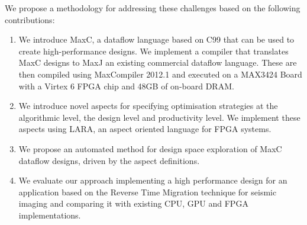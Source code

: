 We propose a methodology for addressing these challenges based on the
following contributions:
\begin{enumerate}
\item We introduce MaxC, a dataflow language based on C99 that can be
  used to create high-performance designs. We implement a compiler
  that translates MaxC designs to MaxJ an existing commercial dataflow
  language. These are then compiled using MaxCompiler 2012.1 and
  executed on a MAX3424 Board with a Virtex 6 FPGA chip and 48GB of
  on-board DRAM.
\item We introduce novel aspects for specifying optimisation
  strategies at the algorithmic level, the design level and
  productivity level. We implement these aspects using
  LARA, an aspect oriented language for FPGA systems.
\item We propose an automated method for design space exploration of
  MaxC dataflow designs, driven by the aspect definitions.
\item We evaluate our approach implementing a high performance design
  for an application based on the Reverse Time Migration technique for
  seismic imaging and comparing it with existing CPU, GPU and FPGA
  implementations.
\end{enumerate}


